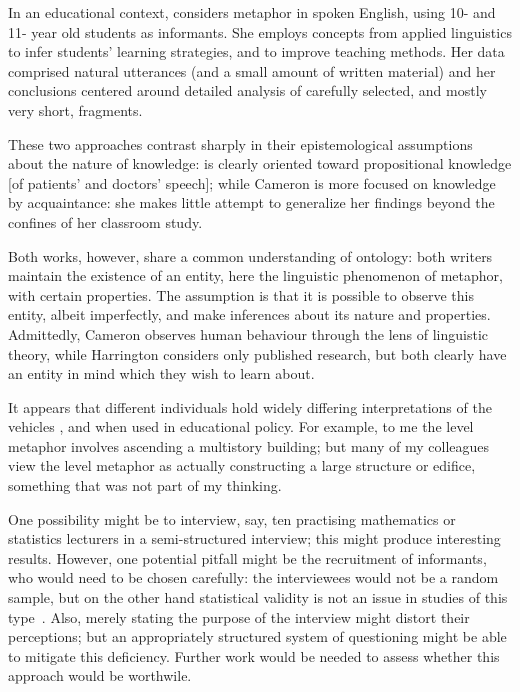 In an educational context,  considers metaphor in
spoken English, using 10- and 11- year old students as informants.
She employs concepts from applied linguistics to infer students'
learning strategies, and to improve teaching methods.  Her data
comprised natural utterances (and a small amount of written material)
and her conclusions centered around detailed analysis of carefully
selected, and mostly very short, fragments.

These two approaches contrast sharply in their epistemological
assumptions about the nature of knowledge: \citeauthor{harrington2012}
is clearly oriented toward propositional knowledge [of patients' and
  doctors' speech]; while Cameron is more focused on knowledge by
acquaintance: she makes little attempt to generalize her findings
beyond the confines of her classroom study.

Both works, however, share a common understanding of ontology: both
writers maintain the existence of an entity, here the linguistic
phenomenon of metaphor, with certain properties.  The assumption is
that it is possible to observe this entity, albeit imperfectly, and
make inferences about its nature and properties.  Admittedly, Cameron
observes human behaviour through the lens of linguistic theory, while
Harrington considers only published research, but both clearly have an
entity in mind which they wish to learn about.

It appears that different individuals hold widely differing
interpretations of the vehicles , 
and  when used in educational policy.  For example,
to me the level metaphor involves ascending a multistory building; but
many of my colleagues view the level metaphor as actually constructing
a large structure or edifice, something that was not part of my
thinking.

One possibility might be to interview, say, ten practising mathematics
or statistics lecturers in a semi-structured interview; this might
produce interesting results.  However, one potential pitfall might be
the recruitment of informants, who would need to be chosen carefully:
the interviewees would not be a random sample, but on the other hand
statistical validity is not an issue in studies of this
type~\citep{ribbins2012}.  Also, merely stating the purpose of the
interview might distort their perceptions; but an appropriately
structured system of questioning might be able to mitigate this
deficiency.  Further work would be needed to assess whether this
approach would be worthwile.

